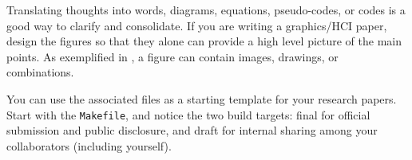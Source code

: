 


Translating thoughts into words, diagrams, equations, pseudo-codes, or codes is a good way to clarify and consolidate.
If you are writing a graphics/HCI paper, design the figures so that they alone can provide a high level picture of the main points.
As exemplified in , a figure can contain images, drawings, or combinations. 


You can use the associated files as a starting template for your research papers.
Start with the \texttt{Makefile}, and notice the two build targets: final for official submission and public disclosure, and draft for internal sharing among your collaborators (including yourself).